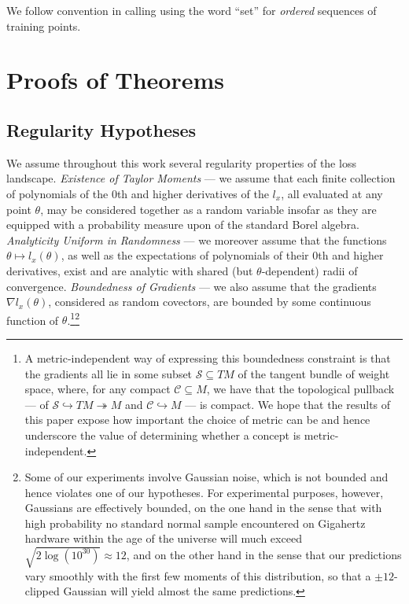 \documentclass{article}
\theoremstyle{plain}
\theoremstyle{definition}
\newcommand{\Cc}{\mathcal{C}}
\newcommand{\Ss}{\mathcal{S}}
\begin{document}
        We follow convention in calling using the word ``set'' for
        \emph{ordered} sequences of training points. 

\section{Proofs of Theorems} \label{sect:proofs}
   
    \subsection{Regularity Hypotheses}
        We assume throughout this work several regularity properties of the
        loss landscape.  \emph{Existence of Taylor Moments} --- we assume that
        each finite collection of polynomials of the $0$th and higher
        derivatives of the $l_x$, all evaluated at any point $\theta$, may be
        considered together as a random variable insofar
        as they are equipped with a probability measure upon of the standard
        Borel algebra.  \emph{Analyticity Uniform in Randomness} --- we
        moreover assume that the functions $\theta \mapsto l_x(\theta)$, as
        well as the expectations of polynomials of their $0$th and higher
        derivatives, exist and are analytic with shared (but
        $\theta$-dependent) radii of convergence.  \emph{Boundedness of
        Gradients} --- we also assume that the gradients $\nabla l_x(\theta)$,
        considered as random covectors, are bounded by some continuous function
        of $\theta$.\footnote{
            A metric-independent way of expressing this boundedness constraint
            is that the gradients all lie in some subset $\Ss \subseteq TM$ of
            the tangent bundle of weight space, where, for any compact $\Cc
            \subseteq M$, we have that the topological pullback --- of
            $\Ss \hookrightarrow TM \twoheadrightarrow M$
            and
            $\Cc \hookrightarrow M$ ---
            is compact.  We hope that the results of this paper expose how
            important the choice of metric can be and hence underscore the
            value of determining  whether a concept is metric-independent.
        }\footnote{
            Some of our experiments involve Gaussian noise, which is not
            bounded and hence violates one of our hypotheses.  For experimental
            purposes, however, Gaussians are effectively bounded, on the one
            hand in the sense that with high probability no standard normal
            sample encountered on Gigahertz hardware within the age of the
            universe will much exceed $\sqrt{2 \log(10^{30})} \approx 12$, and
            on the other hand in the sense that our predictions vary smoothly
            with the first few moments of this distribution, so that a $\pm
            12$-clipped Gaussian will yield almost the same predictions.
        }
\end{document}
